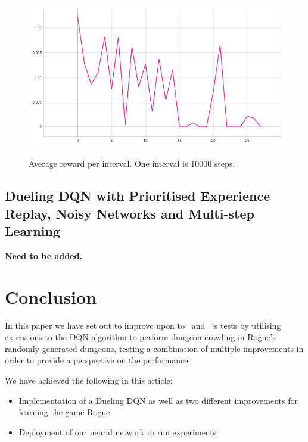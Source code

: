 \documentclass[12pt,a4paper]{article}
\begin{document}
    \begin{figure}[h]
        \caption[DDQN with PER: Average reward per interval.]{Average reward per interval. One interval is 10000 steps.}
        \centering
        \includegraphics[scale=0.5]{interval_score_ddqn_per}
        \label{fig:ddqn_per_interval_score}
    \end{figure}



    \subsection{Dueling DQN with Prioritised Experience Replay, Noisy Networks and Multi-step Learning}\label{subsec:dueling-dqn-with-prioritised-experience-replay-and-noisy-networks}
    \textbf{Need to be added.}

    \section{Conclusion}\label{sec:conclusion}
    In this paper we have set out to improve upon to~\citet{asperti18} and ~\citet{kanagawa19}`s tests by utilising extensions to the DQN algorithm
    to perform dungeon crawling in Rogue's randomly generated dungeons, testing a combination of multiple improvements in order to
    provide a perspective on the performance.

    We have achieved the following in this article:
    \begin{itemize}
        \item Implementation of a Dueling DQN as well as two different improvements for learning the game Rogue
        \item Deployment of our neural network to run experiments
    \end{itemize}
\end{document}
